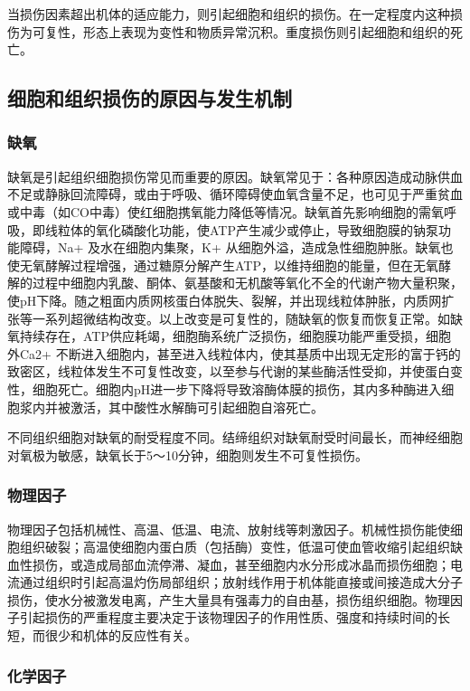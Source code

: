 当损伤因素超出机体的适应能力，则引起细胞和组织的损伤。在一定程度内这种损伤为可复性，形态上表现为变性和物质异常沉积。重度损伤则引起细胞和组织的死亡。

\subsection{细胞和组织损伤的原因与发生机制}

\subsubsection{缺氧}

缺氧是引起组织细胞损伤常见而重要的原因。缺氧常见于：各种原因造成动脉供血不足或静脉回流障碍，或由于呼吸、循环障碍使血氧含量不足，也可见于严重贫血或中毒（如CO中毒）使红细胞携氧能力降低等情况。缺氧首先影响细胞的需氧呼吸，即线粒体的氧化磷酸化功能，使ATP产生减少或停止，导致细胞膜的钠泵功能障碍，Na{+}
及水在细胞内集聚，K{+}
从细胞外溢，造成急性细胞肿胀。缺氧也使无氧酵解过程增强，通过糖原分解产生ATP，以维持细胞的能量，但在无氧酵解的过程中细胞内乳酸、酮体、氨基酸和无机酸等氧化不全的代谢产物大量积聚，使pH下降。随之粗面内质网核蛋白体脱失、裂解，并出现线粒体肿胀，内质网扩张等一系列超微结构改变。以上改变是可复性的，随缺氧的恢复而恢复正常。如缺氧持续存在，ATP供应耗竭，细胞酶系统广泛损伤，细胞膜功能严重受损，细胞外Ca{2+}
不断进入细胞内，甚至进入线粒体内，使其基质中出现无定形的富于钙的致密区，线粒体发生不可复性改变，以至参与代谢的某些酶活性受抑，并使蛋白变性，细胞死亡。细胞内pH进一步下降将导致溶酶体膜的损伤，其内多种酶进入细胞浆内并被激活，其中酸性水解酶可引起细胞自溶死亡。

不同组织细胞对缺氧的耐受程度不同。结缔组织对缺氧耐受时间最长，而神经细胞对氧极为敏感，缺氧长于5～10分钟，细胞则发生不可复性损伤。

\subsubsection{物理因子}

物理因子包括机械性、高温、低温、电流、放射线等刺激因子。机械性损伤能使细胞组织破裂；高温使细胞内蛋白质（包括酶）变性，低温可使血管收缩引起组织缺血性损伤，或造成局部血流停滞、凝血，甚至细胞内水分形成冰晶而损伤细胞；电流通过组织时引起高温灼伤局部组织；放射线作用于机体能直接或间接造成大分子损伤，使水分被激发电离，产生大量具有强毒力的自由基，损伤组织细胞。物理因子引起损伤的严重程度主要决定于该物理因子的作用性质、强度和持续时间的长短，而很少和机体的反应性有关。

\subsubsection{化学因子}

